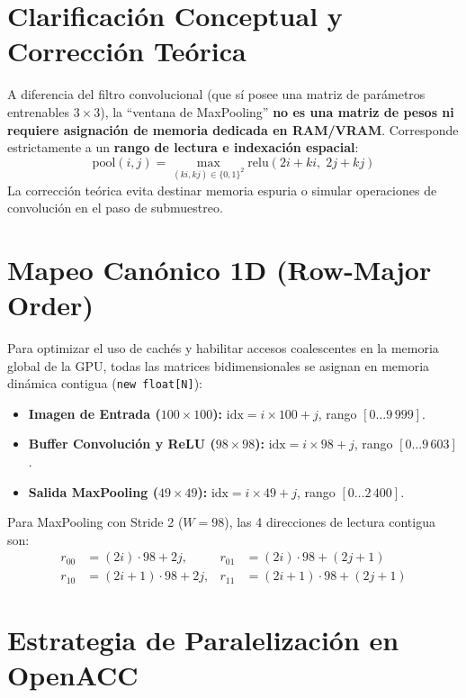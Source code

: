 \documentclass[11pt,letterpaper]{article}
\begin{document}
\section{Clarificación Conceptual y Corrección Teórica}
A diferencia del filtro convolucional (que sí posee una matriz de parámetros entrenables $3 \times 3$), la ``ventana de MaxPooling'' \textbf{no es una matriz de pesos ni requiere asignación de memoria dedicada en RAM/VRAM}. 
Corresponde estrictamente a un \textbf{rango de lectura e indexación espacial}:
\begin{equation}
\text{pool}(i, j) = \max_{(ki, kj) \in \{0, 1\}^2} \text{relu}(2i + ki, \; 2j + kj)
\end{equation}
La corrección teórica evita destinar memoria espuria o simular operaciones de convolución en el paso de submuestreo.

\section{Mapeo Canónico 1D (Row-Major Order)}
Para optimizar el uso de cachés y habilitar accesos coalescentes en la memoria global de la GPU, todas las matrices bidimensionales se asignan en memoria dinámica contigua (\texttt{new float[N]}):
\begin{itemize}
    \item \textbf{Imagen de Entrada ($100 \times 100$):} $\text{idx} = i \times 100 + j$, rango $[0 \dots 9\,999]$.
    \item \textbf{Buffer Convolución y ReLU ($98 \times 98$):} $\text{idx} = i \times 98 + j$, rango $[0 \dots 9\,603]$.
    \item \textbf{Salida MaxPooling ($49 \times 49$):} $\text{idx} = i \times 49 + j$, rango $[0 \dots 2\,400]$.
\end{itemize}

\noindent Para MaxPooling con Stride 2 ($W=98$), las 4 direcciones de lectura contigua son:
\begin{align*}
r_{00} &= (2i) \cdot 98 + 2j, & r_{01} &= (2i) \cdot 98 + (2j + 1) \\
r_{10} &= (2i + 1) \cdot 98 + 2j, & r_{11} &= (2i + 1) \cdot 98 + (2j + 1)
\end{align*}

\section{Estrategia de Paralelización en OpenACC}
\end{document}
